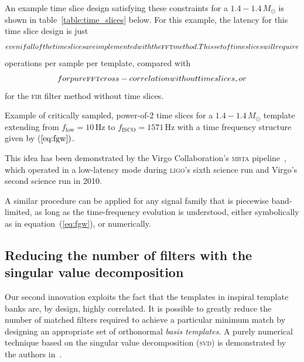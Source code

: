  An example time slice design satisfying these constraints for a $1.4 - 1.4 \, M_{\odot}$ is shown in table~\ref{table:time_slices} below.  For this example, the latency for this time slice design is just $$ even if all of the time slices are implemented with the \textsc{fft} method.  This set of time slices will require $$ operations per sample per template, compared with $$ for pure \textsc{fft} cross-correlation without time slices, or $$ for the \textsc{fir} filter method without time slices.

\begin{table}[!h]
\caption{Example of critically sampled, power-of-2 time slices for a $1.4 - 1.4 \, M_{\odot}$ template extending from $f_\mathrm{low} = 10 \, \mathrm{Hz}$ to $f_\mathrm{ISCO} = 1571\, \mathrm{Hz}$ with a time frequency structure given by ($\ref{eq:fgw})$.}
\label{table:time_slices}
\begin{center}

\end{center}
\end{table}

  This idea has been demonstrated by the Virgo Collaboration's \textsc{mbta} pipeline~\cite{beauville2006,beauville2008}, which operated in a low-latency mode during \textsc{ligo}'s sixth science run and Virgo's second science run in 2010.

A similar procedure can be applied for any signal family that is piecewise band-limited, as long as the time-frequency evolution is understood, either symbolically as in equation~(\ref{eq:fgw}), or numerically.

\subsection{Reducing the number of filters with the singular value decomposition}

Our second innovation exploits the fact that the templates in inspiral template banks are, by design, highly correlated.  It is possible to greatly reduce the number of matched filters required to achieve a particular minimum match by designing an appropriate set of orthonormal {\em basis templates}.  A purely numerical technique based on the singular value decomposition (\textsc{svd}) is demonstrated by the authors in~\cite{Cannon:2010p10398}.


